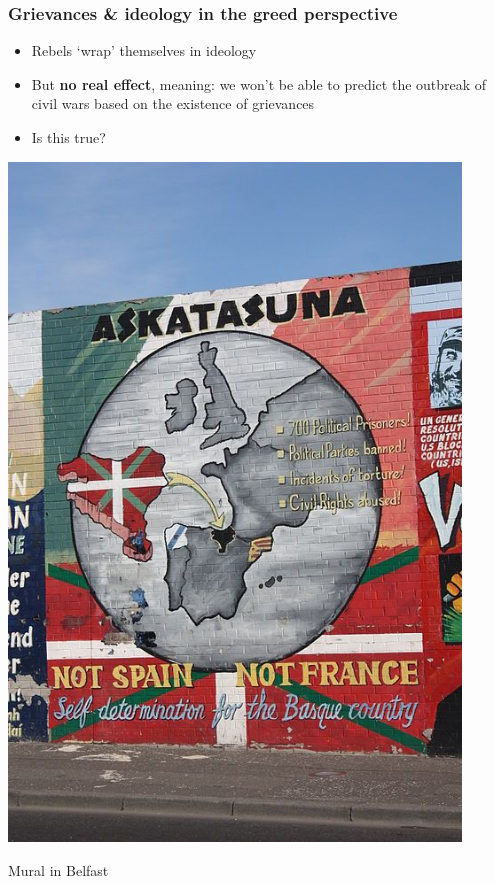 \documentclass[aspectratio=43]{beamer}
\begin{document}
\begin{frame}
\frametitle{Grievances \& ideology in the greed perspective}
\centering

\begin{minipage}{0.55\textwidth}\centering
\begin{itemize}
  \item Rebels `wrap' themselves in ideology
  \item But \textbf{no real effect}, meaning: we won't be able to predict the outbreak of civil wars based on the existence of grievances
  \item<2-> Is this true?
\end{itemize}
\end{minipage}\hfill
\begin{minipage}{0.44\textwidth}\centering
  \includegraphics[width = 0.9\textwidth]{img/belfast_mural}

  {\small Mural in Belfast}
\end{minipage}

\end{frame}
\end{document}
